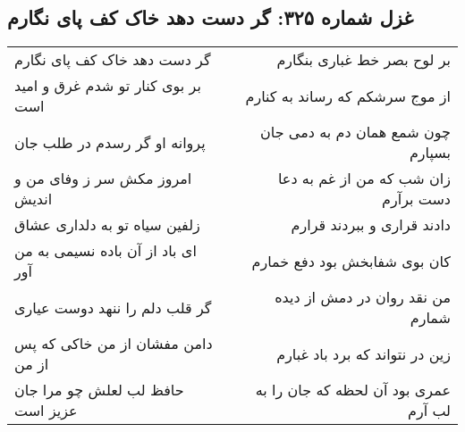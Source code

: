\begin{center}
\section*{غزل شماره ۳۲۵: گر دست دهد خاک کف پای نگارم}
\label{sec:sh325}
\begin{longtable}{l p{0.5cm} r}
گر دست دهد خاک کف پای نگارم
&&
بر لوح بصر خط غباری بنگارم
\\
بر بوی کنار تو شدم غرق و امید است
&&
از موج سرشکم که رساند به کنارم
\\
پروانه او گر رسدم در طلب جان
&&
چون شمع همان دم به دمی جان بسپارم
\\
امروز مکش سر ز وفای من و اندیش
&&
زان شب که من از غم به دعا دست برآرم
\\
زلفین سیاه تو به دلداری عشاق
&&
دادند قراری و ببردند قرارم
\\
ای باد از آن باده نسیمی به من آور
&&
کان بوی شفابخش بود دفع خمارم
\\
گر قلب دلم را ننهد دوست عیاری
&&
من نقد روان در دمش از دیده شمارم
\\
دامن مفشان از من خاکی که پس از من
&&
زین در نتواند که برد باد غبارم
\\
حافظ لب لعلش چو مرا جان عزیز است
&&
عمری بود آن لحظه که جان را به لب آرم
\\
\end{longtable}
\end{center}
